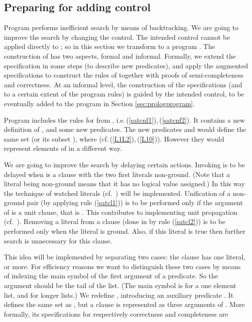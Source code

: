 \documentclass{tlp}
\begin{document}
\subsection{Preparing for adding control}
\label{sec:P2}






Program  performs inefficient search by means of backtracking.
We are going to improve the search by changing the control.
The intended control cannot be applied directly to ;
so in this section we transform   to a program .
The construction of  has two aspects, formal and informal.
Formally, we extend the
specification in some steps (to describe new predicates), and apply the
augmented specifications to construct the rules of 
together with proofs of semi-completeness and correctness.
At an informal level, the construction of the specifications
(and to a certain extent of the program rules) is guided by the
intended control, to be eventually added to the program in Section
\ref{sec:prologprogram}.  





Program  includes the rules for  from ,
i.e.\,(\ref{satcnf1}),\,(\ref{satcnf2}).
It contains a new definition of , and some new predicates.
The new predicates and  would define the same set 
(or its subset  ),
where 
(cf.\,(\ref{L1L2}),\,(\ref{L10})).
However they would represent elements of   in a different way.


We are going to improve the search by delaying certain actions.
Invoking   is to be delayed when 
is a clause with the two first literals non-ground.
      (Note that a literal being non-ground means that it has no logical
      value assigned.)
In this way the technique of watched literals (cf.\ \cite{handbook-SATsolvers})
will be implemented. 
Unification of a non-ground pair  (by applying rule (\ref{satcl1})) 
is to be performed only if the argument of  is a unit clause,
that is .
This contributes to implementing unit propagation
(cf.\ \cite{handbook-SATsolvers}).
Removing a literal from a clause (done in  by rule (\ref{satcl2})) is to
be performed only when the literal is ground.
Also, if this literal is true then further search is unnecessary for this
clause.





This idea will be implemented 
 by separating two cases: the clause has one literal, or more.
For efficiency reasons we want to distinguish these two cases by means of
indexing the main symbol of the first argument of a predicate.
So the argument should be the tail of the list.  (The main symbol is 
for a one element list, and  for longer lists.)
We redefine  , 
introducing an auxiliary predicate .
It defines the same set as , but a clause 
 is represented as three arguments 
of  .
More formally, its specifications for respectively correctness and
completeness are
\end{document}
